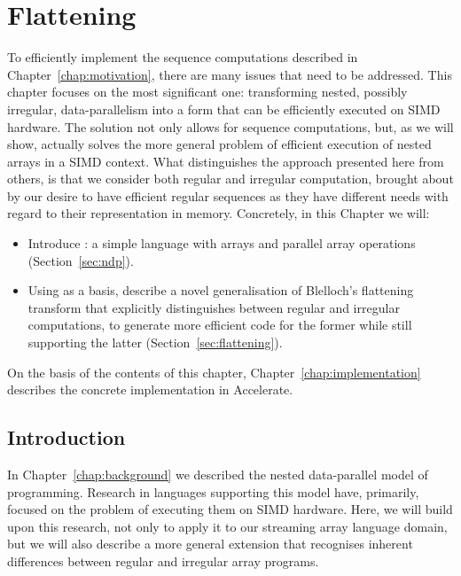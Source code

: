 \chapter{Flattening}%
\label{chap:theory}

To efficiently implement the sequence computations described in Chapter~\ref{chap:motivation}, there are many issues that need to be addressed. This chapter focuses on the most significant one: transforming nested, possibly irregular, data-parallelism into a form that can be efficiently executed on SIMD hardware. The solution not only allows for sequence computations, but, as we will show, actually solves the more general problem of efficient execution of nested arrays in a SIMD context. What distinguishes the approach presented here from others, is that we consider both regular and irregular computation, brought about by our desire to have efficient regular sequences as they have different needs with regard to their representation in memory. Concretely, in this Chapter we will:
%
\begin{itemize}
\item Introduce \ndp{}: a simple language with arrays and parallel array operations (Section~\ref{sec:ndp}).
\item Using \ndp{} as a basis, describe a novel generalisation of Blelloch's flattening transform that explicitly distinguishes between regular and irregular computations, to generate more efficient code for the former while still supporting the latter (Section~\ref{sec:flattening}).
\end{itemize}

On the basis of the contents of this chapter, Chapter~\ref{chap:implementation} describes the concrete implementation in Accelerate.

\section{Introduction}

In Chapter~\ref{chap:background} we described the nested data-parallel model of programming. Research in languages supporting this model have, primarily, focused on the problem of executing them on SIMD hardware. Here, we will build upon this research, not only to apply it to our streaming array language domain, but we will also describe a more general extension that recognises inherent differences between regular and irregular array programs.


